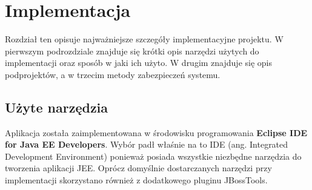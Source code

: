 \chapter{Implementacja}
\label{cha:implementacja}
Rozdział ten opisuje najważniejsze szczegóły implementacyjne projektu. W pierwszym podrozdziale znajduje się krótki opis narzędzi użytych do implementacji oraz sposób w jaki ich użyto. W drugim znajduje się opis podprojektów, a w trzecim metody zabezpieczeń systemu.
\section{Użyte narzędzia}
Aplikacja została zaimplementowana w środowisku programowania \textbf{Eclipse IDE for Java EE Developers}. Wybór padł właśnie na to IDE (ang. Integrated Development Environment) ponieważ posiada wszystkie niezbędne narzędzia do tworzenia aplikacji JEE. Oprócz domyślnie dostarczanych narzędzi przy implementacji skorzystano również z dodatkowego pluginu JBossTools.

